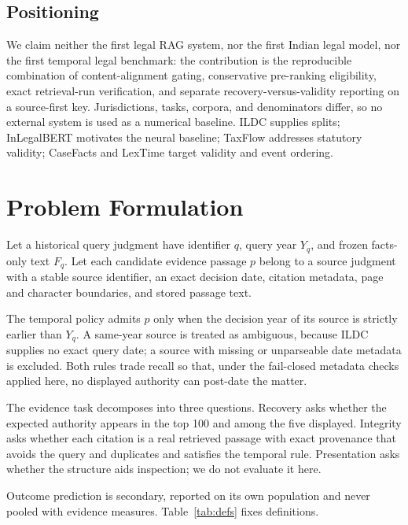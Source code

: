 \documentclass[conference]{IEEEtran}
\begin{document}
\subsection{Positioning}

We claim neither the first legal RAG system, nor the first
Indian legal model, nor the first temporal legal benchmark: the contribution is
the reproducible combination of content-alignment gating,
conservative pre-ranking eligibility, exact retrieval-run
verification, and separate recovery-versus-validity reporting on a source-first key.
Jurisdictions, tasks, corpora, and denominators differ, so no external system is
used as a numerical baseline. ILDC \cite{malik2021} supplies splits; InLegalBERT \cite{paul2023} motivates the neural baseline;
TaxFlow \cite{taxflow2026} addresses statutory validity; CaseFacts \cite{casefacts2026} and LexTime
\cite{lextime2025} target validity and event ordering.

\section{Problem Formulation}
\label{sec:problem}

Let a historical query judgment have identifier $q$, query year $Y_q$, and
frozen facts-only text $F_q$. Let each candidate evidence passage $p$ belong to
a source judgment with a stable source identifier, an exact decision date,
citation metadata, page and character boundaries, and stored passage text.

The temporal policy admits $p$ only when the decision year of its source is
strictly earlier than $Y_q$. A same-year source is treated as ambiguous, because
ILDC supplies no exact query date; a source with missing or unparseable date
metadata is excluded. Both rules trade
recall so that, under the fail-closed metadata checks applied here, no
displayed authority can post-date the matter.

The evidence task decomposes into three questions. Recovery asks whether the expected authority appears in the top 100 and among the five displayed. Integrity asks whether each citation is a real retrieved passage with exact provenance that avoids the query and duplicates and satisfies the temporal rule. Presentation asks whether the structure aids inspection; we do not evaluate it here.

Outcome prediction is secondary, reported on its own
population and never pooled with evidence measures. Table~\ref{tab:defs} fixes
definitions.
\end{document}
